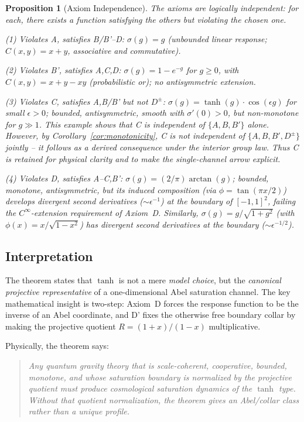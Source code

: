 \documentclass[aps,prd,twocolumn,superscriptaddress,nofootinbib]{revtex4-2}
\newtheorem{proposition}{Proposition}
\begin{document}
\begin{proposition}[Axiom Independence]
\label{prop:independence}
The axioms are logically independent: for each, there exists a function satisfying the others but violating the chosen one.

\textit{(1) Violates A, satisfies B/B'--D:} $\sigma(g) = g$ (unbounded linear response; $C(x,y) = x+y$, associative and commutative).

\textit{(2) Violates B', satisfies A,C,D:} $\sigma(g) = 1 - e^{-g}$ for $g \geq 0$, with $C(x,y) = x + y - xy$ (probabilistic or); no antisymmetric extension.

\textit{(3) Violates C, satisfies A,B/B' but not $D^\pm$:} $\sigma(g) = \tanh(g) \cdot \cos(\epsilon g)$ for small $\epsilon > 0$; bounded, antisymmetric, smooth with $\sigma'(0) > 0$, but non-monotone for $g \gg 1$. This example shows that C is independent of $\{A, B, B'\}$ alone. However, by Corollary~\ref{cor:monotonicity}, C is \textit{not} independent of $\{A, B, B', D^\pm\}$ jointly -- it follows as a derived consequence under the interior group law. Thus C is retained for physical clarity and to make the single-channel arrow explicit.

\textit{(4) Violates D, satisfies A--C,B':} $\sigma(g) = (2/\pi)\arctan(g)$; bounded, monotone, antisymmetric, but its induced composition (via $\phi = \tan(\pi x/2)$) develops divergent second derivatives ($\sim \epsilon^{-1}$) at the boundary of $[-1,1]^2$, failing the $C^\infty$-extension requirement of Axiom~D. Similarly, $\sigma(g) = g/\sqrt{1+g^2}$ (with $\phi(x) = x/\sqrt{1-x^2}$) has divergent second derivatives at the boundary ($\sim \epsilon^{-1/2}$).
\end{proposition}

\subsection{Interpretation}

The theorem states that $\tanh$ is not a mere \textit{model choice}, but the \textit{canonical projective representative} of a one-dimensional Abel saturation channel. The key mathematical insight is two-step: Axiom~D forces the response function to be the inverse of an Abel coordinate, and D' fixes the otherwise free boundary collar by making the projective quotient $R=(1+x)/(1-x)$ multiplicative.

Physically, the theorem says:
\begin{quote}
\textit{Any quantum gravity theory that is scale-coherent, cooperative, bounded, monotone, and whose saturation boundary is normalized by the projective quotient must produce cosmological saturation dynamics of the $\tanh$ type. Without that quotient normalization, the theorem gives an Abel/collar class rather than a unique profile.}
\end{quote}
\end{document}
